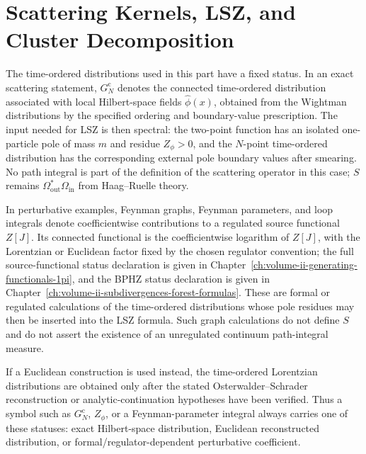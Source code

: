 \chapter{Scattering Kernels, LSZ, and Cluster Decomposition}
\label{ch:volume-ii-scattering-kernels}
\ConventionsLorentzian

\begin{definition}
\label{def:scattering-time-ordered-correlator-status}
The time-ordered distributions used in this part have a fixed status.  In an
exact scattering statement, \(G_N^{\mathrm c}\) denotes the connected
time-ordered distribution associated with local Hilbert-space fields
\(\widehat\phi(x)\), obtained from the Wightman distributions by the specified
ordering and boundary-value prescription.  The input needed for LSZ is then
spectral: the two-point function has an isolated one-particle pole of mass
\(m\) and residue \(Z_\phi>0\), and the \(N\)-point time-ordered distribution
has the corresponding external pole boundary values after smearing.  No path
integral is part of the definition of the scattering operator in this
case; \(S\) remains \(\Omega_{\mathrm{out}}^*\Omega_{\mathrm{in}}\) from
Haag--Ruelle theory.

In perturbative examples, Feynman graphs, Feynman parameters, and loop
integrals denote coefficientwise contributions to a regulated source
functional \(Z[J]\).  Its connected functional is the coefficientwise
logarithm of \(Z[J]\), with the Lorentzian or Euclidean factor fixed by the
chosen regulator convention; the full source-functional status declaration is
given in Chapter~\ref{ch:volume-ii-generating-functionals-1pi}, and the BPHZ
status declaration is given in
Chapter~\ref{ch:volume-ii-subdivergences-forest-formulas}.  These are formal
or regulated calculations of the time-ordered distributions whose pole
residues may then be inserted into the LSZ formula.  Such graph calculations
do not define \(S\) and do not assert the existence of an unregulated
continuum path-integral measure.

If a Euclidean construction is used instead, the time-ordered Lorentzian
distributions are obtained only after the stated Osterwalder--Schrader
reconstruction or analytic-continuation hypotheses have been verified.  Thus a
symbol such as \(G_N^{\mathrm c}\), \(Z_\phi\), or a Feynman-parameter integral
always carries one of these statuses: exact Hilbert-space distribution,
Euclidean reconstructed distribution, or formal/regulator-dependent
perturbative coefficient.
\end{definition}


